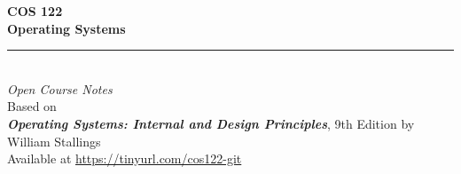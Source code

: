 \begin{titlepage}

    \vspace*{4cm}

    \begin{center}
        {\Huge \bfseries COS 122}\\[0.5cm]
        {\Huge \bfseries Operating Systems}\\[1.5cm]
        
        \rule{\textwidth}{0.4pt}\\[1.5cm]

    
        {\normalsize \textit{Open Course Notes}}\\[1.5cm]
        {\normalsize Based on \\ \textit{\textbf{Operating Systems: Internal and Design Principles}}, 9th Edition by William Stallings}\\[3cm]
        

        {\footnotesize Available at \url{https://tinyurl.com/cos122-git}}
    \end{center}
\end{titlepage}

\tableofcontents
\newpage
